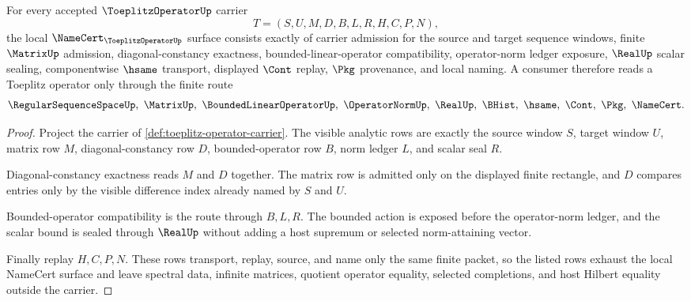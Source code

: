 \begin{theorem}
\label{thm:toeplitz-operator-namecert-obligations}
For every accepted $\ToeplitzOperatorUp$ carrier
$$
T=(S,U,M,D,B,L,R,H,C,P,N),
$$
the local $\NameCert_{\ToeplitzOperatorUp}$ surface consists exactly of carrier admission for the source and target sequence windows, finite $\MatrixUp$ admission, diagonal-constancy exactness, bounded-linear-operator compatibility, operator-norm ledger exposure, $\RealUp$ scalar sealing, componentwise $\hsame$ transport, displayed $\Cont$ replay, $\Pkg$ provenance, and local naming. A consumer therefore reads a Toeplitz operator only through the finite route
$$
\RegularSequenceSpaceUp,\ \MatrixUp,\ \BoundedLinearOperatorUp,\ \OperatorNormUp,\ \RealUp,\ \BHist,\ \hsame,\ \Cont,\ \Pkg,\ \NameCert .
$$
\end{theorem}
\begin{proof}
Project the carrier of \autoref{def:toeplitz-operator-carrier}. The visible analytic rows are exactly the source window $S$, target window $U$, matrix row $M$, diagonal-constancy row $D$, bounded-operator row $B$, norm ledger $L$, and scalar seal $R$.

Diagonal-constancy exactness reads $M$ and $D$ together. The matrix row is admitted only on the displayed finite rectangle, and $D$ compares entries only by the visible difference index already named by $S$ and $U$.

Bounded-operator compatibility is the route through $B,L,R$. The bounded action is exposed before the operator-norm ledger, and the scalar bound is sealed through $\RealUp$ without adding a host supremum or selected norm-attaining vector.

Finally replay $H,C,P,N$. These rows transport, replay, source, and name only the same finite packet, so the listed rows exhaust the local NameCert surface and leave spectral data, infinite matrices, quotient operator equality, selected completions, and host Hilbert equality outside the carrier.
\end{proof}

